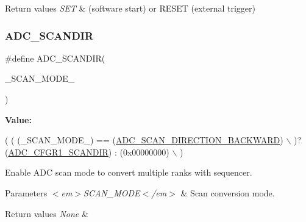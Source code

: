 \begin{DoxyRetVals}{Return values}
{\em S\+ET} & (software start) or R\+E\+S\+ET (external trigger) \\
\hline
\end{DoxyRetVals}
\mbox{\label{group___a_d_c___private___macros_gaf160864141810a124f506714b47446ca}} 
\subsubsection{\texorpdfstring{A\+D\+C\+\_\+\+S\+C\+A\+N\+D\+IR}{ADC\_SCANDIR}}
{\footnotesize\ttfamily \#define A\+D\+C\+\_\+\+S\+C\+A\+N\+D\+IR(\begin{DoxyParamCaption}\item[{}]{\+\_\+\+S\+C\+A\+N\+\_\+\+M\+O\+D\+E\+\_\+ }\end{DoxyParamCaption})}

{\bfseries Value\+:}
\begin{DoxyCode}
( ( (\_SCAN\_MODE\_) == (\hyperlink{group___a_d_c___scan__mode_gae160445e1a005fba64d739c321ae61b9}{ADC\_SCAN\_DIRECTION\_BACKWARD})                           \(\backslash\)
    )? (\hyperlink{group___peripheral___registers___bits___definition_ga138c4d67e5735326ffc922409f3fc8f4}{ADC\_CFGR1\_SCANDIR}) : (0x00000000)                                      \(\backslash\)
  )
\end{DoxyCode}


Enable A\+DC scan mode to convert multiple ranks with sequencer. 


\begin{DoxyParams}{Parameters}
{\em $<$em$>$\+S\+C\+A\+N\+\_\+\+M\+O\+D\+E$<$/em$>$} & Scan conversion mode. \\
\hline
\end{DoxyParams}

\begin{DoxyRetVals}{Return values}
{\em None} & \\
\hline
\end{DoxyRetVals}
\mbox{\label{group___a_d_c___private___macros_ga84692d85aac11c581274b17e74cabc08}} 
